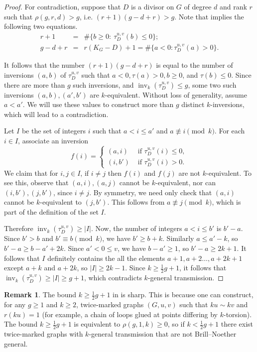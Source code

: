 \documentclass[11pt]{article}
\theoremstyle{definition}
\newtheorem{rema}[theo]{Remark}
\numberwithin{equation}{section}
\newcommand{\inv}{\operatorname{inv}}
\newcommand{\tauD}{\tau^{u,v}_D}
\begin{document}
\begin{proof}
For contradiction, suppose that $D$ is a divisor on $G$ of degree $d$ and rank $r$ such that $\rho(g,r,d) > g$, i.e. $(r+1)(g-d+r) > g$. 
Note that  implies the following two equations.
\begin{eqnarray*}
r+1 &=& \# \{ b \geq 0:\ \tauD(b) \leq 0 \};\\
g-d+r &=& r(K_G-D) +1 = \# \{ a < 0: \tauD(a) > 0 \}.
\end{eqnarray*}

It follows that the number $(r+1)(g-d+r)$ is equal to the number of inversions $(a,b)$ of $\tauD$ such that $a < 0, \tau(a) >0, b \geq 0$, and $\tau(b) \leq 0$.
Since there are more than $g$ such inversions, and $\inv_k(\tauD) \leq g$, some two such inversions $(a,b), (a',b')$ are $k$-equivalent. Without loss of generality, assume $a < a'$. We will use these values to construct more than $g$ distinct $k$-inversions, which will lead to a contradiction.

Let $I$ be the set of integers $i$ such that $a < i \leq a'$ and $a \not\equiv i \pmod{k}$. For each $i \in I$, associate an inversion $$f(i) = \begin{cases}
(a,i) & \mbox{ if } \tauD(i) \leq 0,\\
(i,b') & \mbox{ if } \tauD(i) > 0.
\end{cases}$$
We claim that for $i,j \in I$, if $i \neq j$ then $f(i)$ and $f(j)$ are not $k$-equivalent. To see this, observe that $(a,i),(a,j)$ cannot be $k$-equivalent, nor can $(i,b'),(j,b')$, since $i \neq j$. By symmetry, we need only check that $(a,i)$ cannot be $k$-equivalent to $(j,b')$. This follows from $a \not\equiv j \pmod{k}$, which is part of the definition of the set $I$.

Therefore $\inv_k(\tauD) \geq |I|$. Now, the number of integers $a < i \leq b'$ is $b'-a$. Since $b' > b$ and $b' \equiv b \pmod{k}$, we have $b' \geq b+k$. Similarly $a \leq a'-k$, so $b'-a \geq b-a' + 2k$. Since $a' < 0 \leq v$, we have $b-a' \geq 1$, so $b'-a \geq 2k+1$. It follows that $I$ definitely contains the all the elements $a+1, a+2 \ldots, a+2k+1$ except $a+k$ and $a+2k$, so $|I| \geq 2k-1$. Since $k \geq \frac12 g + 1$, it follows that $\inv_k(\tauD) \geq |I| \geq g+1$, which contradicts $k$-general transmission.
\end{proof}

\begin{rema}
The bound $k \geq \frac12 g + 1$ in  is sharp. This is because one can construct, for any $g \geq 1$ and $k \geq 2$, twice-marked graphs $(G,u,v)$ such that $ku \sim kv$ and $r(ku) = 1$ (for example, a chain of loops glued at points differing by $k$-torsion). The bound $k \geq \frac12 g + 1$ is equivalent to $\rho(g,1,k) \geq 0$, so if $k < \frac12 g + 1$ there exist twice-marked graphs with $k$-general transmission that are not Brill--Noether general.
\end{rema}
\end{document}
